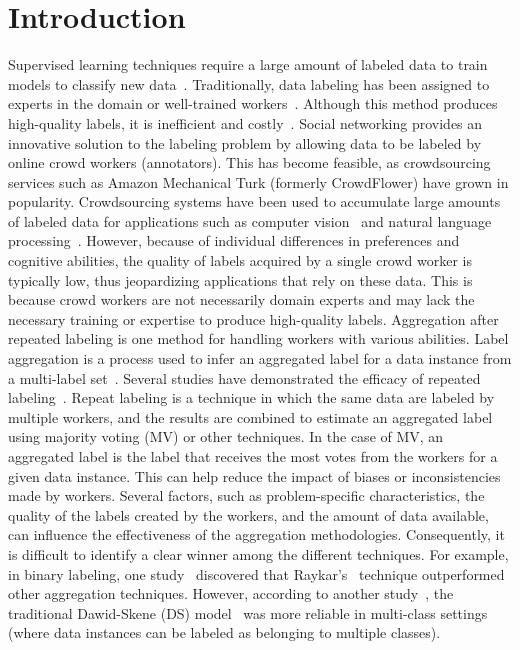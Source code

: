 \section{Introduction}
Supervised learning techniques require a large amount of labeled data to train models to classify new data~\cite{jiang_Wrapper_2019,jiang_Class_2019}. Traditionally, data labeling has been assigned to experts in the domain or well-trained workers~\cite{tian_MaxMargin_2019}. Although this method produces high-quality labels, it is inefficient and costly~\cite{li_Noise_2016,li_Noise_2019}.  Social networking provides an innovative solution to the labeling problem by allowing data to be labeled by online crowd workers (annotators). This has become feasible, as crowdsourcing services such as Amazon Mechanical Turk (formerly CrowdFlower) have grown in popularity. Crowdsourcing systems have been used to accumulate large amounts of labeled data for applications such as computer vision~\cite{deng_ImageNet_2009,liu_Variational_2012} and natural language processing~\cite{karger_Budget_2014}. However, because of individual differences in preferences and cognitive abilities, the quality of labels acquired by a single crowd worker is typically low, thus jeopardizing applications that rely on these data. This is because crowd workers are not necessarily domain experts and may lack the necessary training or expertise to produce high-quality labels.
Aggregation after repeated labeling is one method for handling workers with various abilities. Label aggregation is a process used to infer an aggregated label for a data instance from a multi-label set~\cite{sheshadri_SQUARE_2013}. Several studies have demonstrated the efficacy of repeated labeling~\cite{tu_multilabel_2018,zhang_multilabelinferencecrowdsourcing_2018}. Repeat labeling is a technique in which the same data are labeled by multiple workers, and the results are combined to estimate an aggregated label using majority voting (MV) or other techniques. In the case of MV, an aggregated label is the label that receives the most votes from the workers for a given data instance. This can help reduce the impact of biases or inconsistencies made by workers. Several factors, such as problem-specific characteristics, the quality of the labels created by the workers, and the amount of data available, can influence the effectiveness of the aggregation methodologies. Consequently, it is difficult to identify a clear winner among the different techniques. For example, in binary labeling, one study~\cite{sheshadri_SQUARE_2013} discovered that Raykar's~\cite{raykar_Learning_2010} technique outperformed other aggregation techniques. However, according to another study~\cite{zheng_Truth_2017}, the traditional Dawid-Skene (DS) model~\cite{dawid_Maximum_1979} was more reliable in multi-class settings (where data instances can be labeled as belonging to multiple classes).
